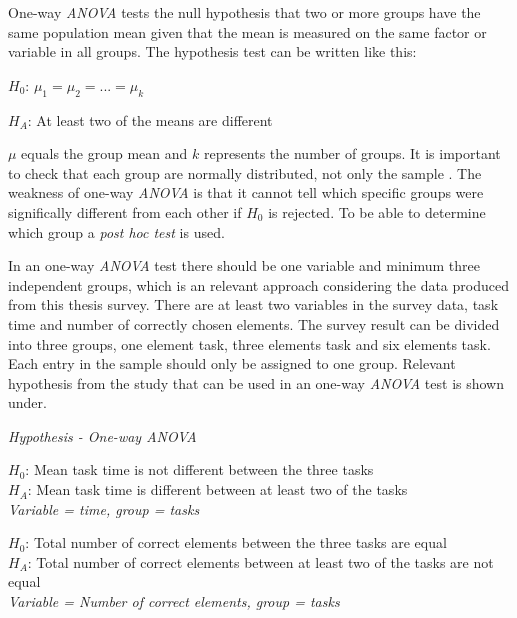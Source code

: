 One-way \textit{ANOVA} tests the null hypothesis that two or more groups have the same population mean given that the mean is measured on the same factor or variable in all groups\citep{LundResearchLtd2013a}. The hypothesis test can be written like this:\newline

\centerline{$H_{0}$:  $\mu_{1} =  \mu_{2} = ... = \mu_{k} $} 
\centerline{$H_{A}$:  At least two of the means are different}

$\mu$ equals the group mean and $k$ represents the number of groups. It is important to check that each group are normally distributed, not only the sample \citep{LundResearchLtd2013a}. The weakness of one-way \textit{ANOVA} is that it cannot tell which specific groups were significally different from each other if $H_{0}$ is rejected. To be able to determine which group a \textit{post hoc test} is used. 

In an one-way \textit{ANOVA} test there should be one variable and minimum three independent groups, which is an relevant approach considering the data produced from this thesis survey. There are at least two variables in the survey data, task time and number of correctly chosen elements. The survey result can be divided into three groups, one element task, three elements task and six elements task. Each entry in the sample should only be assigned to one group. Relevant hypothesis from the study that can be used in an one-way \textit{ANOVA} test is shown under. \newline

\begin{framed}
		\begin{center}
			\textit{Hypothesis - One-way \textit{ANOVA}} \newline
			
			$H_{0}$: Mean task time is not different between the three tasks\\
			$H_{A}$: Mean task time is different between at least two of the tasks\\
			\textit{Variable = time, group = tasks}\newline
			
			$H_{0}$: Total number of correct elements between the three tasks are equal \\
			$H_{A}$: Total number of correct elements between at least two of the tasks are not equal \\
			\textit{Variable = Number of correct elements, group = tasks}\newline
	\end{center}
\end{framed}

